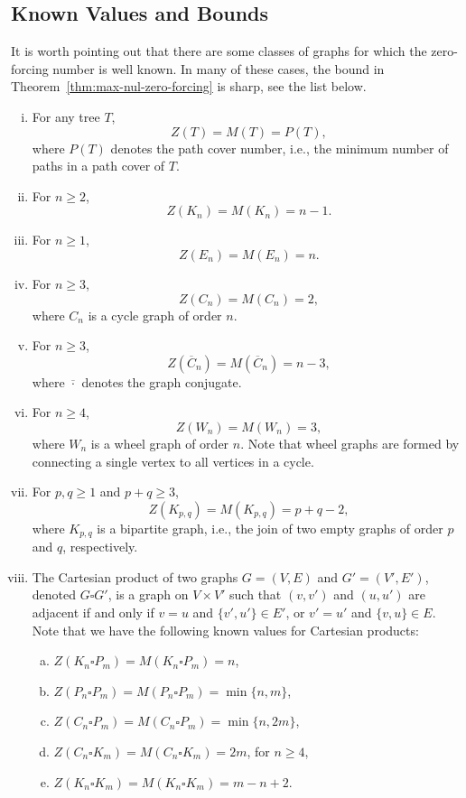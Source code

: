 \documentclass{article}
\theoremstyle{definition}
\newcommand*\conj[1]{\overline{#1}}
\begin{document}
\subsection{Known Values and Bounds}\label{subsec:zf-values-bounds}
It is worth pointing out that there are some classes of graphs for which the zero-forcing number is well known. 
In many of these cases, the bound in Theorem~\ref{thm:max-nul-zero-forcing} is sharp, see the list below. 
\begin{enumerate}[i.]
\item For any tree $T$, 
\[
Z(T) = M(T) = P(T),
\]
where $P(T)$ denotes the path cover number, i.e., the minimum number of paths in a path cover of $T$.
\item For $n\geq 2$,
\[
Z(K_{n}) = M(K_{n}) = n-1. 
\]
\item For $n\geq 1$,
\[
Z(E_{n}) = M(E_{n}) = n.
\]
\item For $n\geq 3$,
\[
Z(C_{n}) = M(C_{n}) = 2,
\]
where $C_{n}$ is a cycle graph of order $n$. 
\item For $n\geq 3$,
\[
Z(\conj{C}_{n}) = M(\conj{C}_{n}) = n-3,
\]
where $\conj{\cdot}$ denotes the graph conjugate. 
\item For $n\geq 4$,
\[
Z(W_{n}) = M(W_{n}) = 3,
\]
where $W_{n}$ is a wheel graph of order $n$. Note that wheel graphs are formed by connecting a single vertex to all vertices in a cycle. 
\item For $p,q\geq 1$ and $p+q\geq 3$, 
\[
Z(K_{p,q}) = M(K_{p,q}) = p+q-2,
\]
where $K_{p,q}$ is a bipartite graph, i.e., the join of two empty graphs of order $p$ and $q$, respectively.
\item The Cartesian product of two graphs $G=(V,E)$ and $G'=(V',E')$, denoted $G\square G'$, is a graph on $V\times V'$ such that $(v,v')$ and $(u,u')$ are adjacent if and only if $v=u$ and $\{v',u'\}\in E'$, or $v'=u'$ and $\{v,u\}\in E$.  Note that we have the following known values for Cartesian products:
	\begin{enumerate}[a.]
	\item $Z\left(K_{n}\square P_{m}\right) = M\left(K_{n}\square P_{m}\right) = n$,
	\item $Z\left(P_{n}\square P_{m}\right) = M\left(P_{n}\square P_{m}\right) = \min\{n,m\}$,
	\item $Z\left(C_{n}\square P_{m}\right) = M\left(C_{n}\square P_{m}\right) = \min\{n,2m\}$,
	\item $Z\left(C_{n}\square K_{m}\right) = M\left(C_{n}\square K_{m}\right) = 2m$, for $n\geq 4$,
	\item $Z\left(K_{n}\square K_{m}\right) = M\left(K_{n}\square K_{m}\right) = m-n + 2$.
	\end{enumerate}
\end{enumerate}
\end{document}

